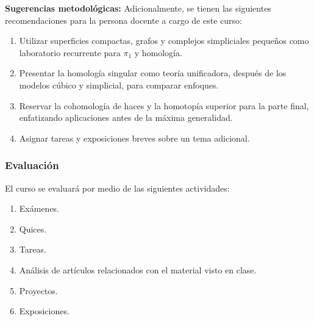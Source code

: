 \begin{refsection}
\textbf{Sugerencias metodológicas:} Adicionalmente, se tienen las siguientes recomendaciones para la
persona docente a cargo de este curso:
\begin{enumerate}
    \item Utilizar superficies compactas, grafos y complejos simpliciales pequeños como laboratorio recurrente para $\pi_1$ y homología.
    \item Presentar la homología singular como teoría unificadora, después de los modelos cúbico y simplicial, para comparar enfoques.
    \item Reservar la cohomología de haces y la homotopía superior para la parte final, enfatizando aplicaciones antes de la máxima generalidad.
    \item Asignar tareas y exposiciones breves sobre un tema adicional.
\end{enumerate}

\subsubsection*{Evaluación}

El curso se evaluará por medio de las siguientes actividades:

\begin{enumerate}
\item Exámenes.
\item Quices.
\item Tareas.
\item Análisis de artículos relacionados con el material visto en clase.
\item Proyectos.
\item Exposiciones.
\end{enumerate}

\nocite{GG99}
\nocite{Hat02}
\nocite{Mun00}
\nocite{kosn92}
\nocite{mass91}

\printcursosbibliography

\end{refsection}
